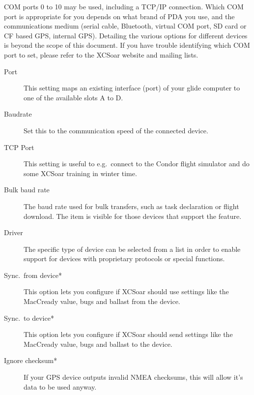 COM ports 0 to 10 may be used, including a TCP/IP connection.  
Which COM port is appropriate for you
depends on what brand of PDA you use, and the communications medium
(serial cable, Bluetooth, virtual COM port, SD card or CF based GPS,
internal GPS).  Detailing the various options for different devices is
beyond the scope of this document.  If you have trouble identifying
which COM port to set, please refer to the XCSoar website and mailing
lists.

\begin{description}
\item[Port]  This setting maps an existing interface (port) of your 
  glide computer to one of the available slots A to D.
\item[Baudrate]  Set this to the communication speed of the connected device.
\item[TCP Port]  This setting is useful to e.g.\ connect to the Condor flight
  simulator and do some XCSoar training in winter time.
\item[Bulk baud rate]  The baud rate used for bulk transfers, such 
  as task declaration or flight download. The item is visible for those 
  devices that support the feature.
\item[Driver]  The specific type of device can be selected from a list in order
  to enable support for devices with proprietary protocols or special
  functions.
\item[Sync.\ from device*]  This option lets you configure if XCSoar should use settings
  like the MacCready value, bugs and ballast from the device.
\item[Sync.\ to device*]  This option lets you configure if XCSoar should send settings
  like the MacCready value, bugs and ballast to the device.
\item[Ignore checksum*] If your GPS device outputs invalid NMEA checksums, this 
  will allow it's data to be used anyway.
\end{description}
